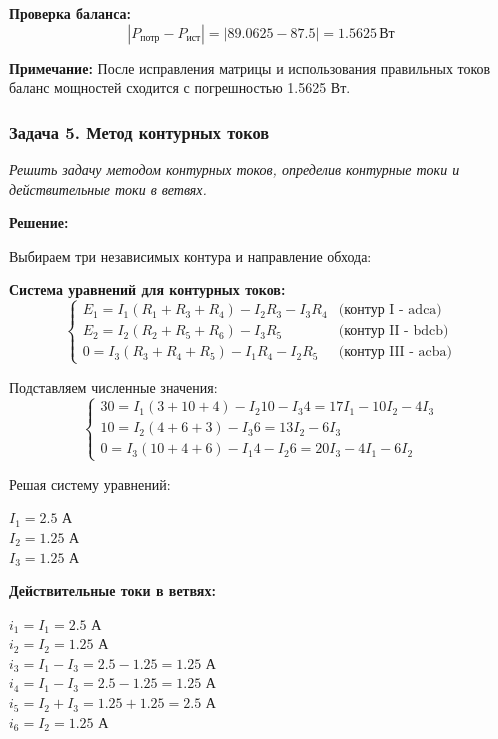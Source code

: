 \textbf{Проверка баланса:}
\begin{equation}
|P_{\text{потр}} - P_{\text{ист}}| = |89.0625 - 87.5| = 1.5625\,\text{Вт}
\end{equation}

\textbf{Примечание:} После исправления матрицы и использования правильных токов баланс мощностей сходится с погрешностью 1.5625 Вт.




\subsubsection{Задача 5. Метод контурных токов}
\textit{Решить задачу методом контурных токов, определив контурные токи и действительные токи в ветвях.}

\textbf{Решение:}

Выбираем три независимых контура и направление обхода:

\textbf{Система уравнений для контурных токов:}
$$\begin{cases}
E_1 = I_1 (R_1 + R_3 + R_4) - I_2R_3 - I_3R_4 & \text{(контур I - adca)} \\
E_2 = I_2 (R_2 + R_5 + R_6) - I_3R_5 & \text{(контур II - bdcb)} \\
0 = I_3 (R_3 + R_4 + R_5) - I_1R_4 - I_2R_5 & \text{(контур III - acba)}
\end{cases}$$

Подставляем численные значения:
$$\begin{cases}
30 = I_1 (3 + 10 + 4) - I_2 10 - I_3 4 = 17I_1 - 10I_2 - 4I_3 \\
10 = I_2 (4 + 6 + 3) - I_3 6 = 13I_2 - 6I_3 \\
0 = I_3 (10 + 4 + 6) - I_1 4 - I_2 6 = 20I_3 - 4I_1 - 6I_2
\end{cases}$$

Решая систему уравнений:
\begin{flushleft}
$I_1 = 2.5$ А \\
$I_2 = 1.25$ А \\
$I_3 = 1.25$ А
\end{flushleft}

\textbf{Действительные токи в ветвях:}
\begin{flushleft}
$i_1 = I_1 = 2.5$ А \\
$i_2 = I_2 = 1.25$ А \\
$i_3 = I_1 - I_3 = 2.5 - 1.25 = 1.25$ А \\
$i_4 = I_1 - I_3 = 2.5 - 1.25 = 1.25$ А \\
$i_5 = I_2 + I_3 = 1.25 + 1.25 = 2.5$ А \\
$i_6 = I_2 = 1.25$ А
\end{flushleft}

